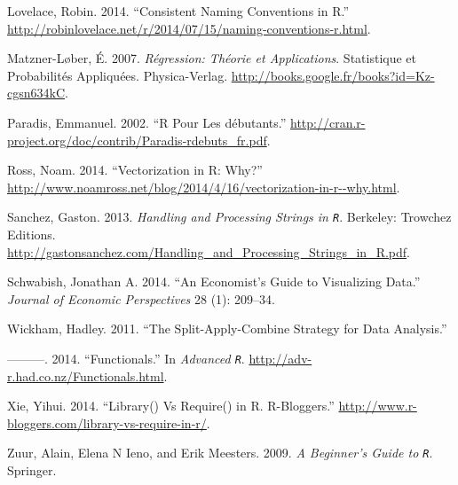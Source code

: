 \documentclass[
  11pt,
]{book}
\numberwithin{equation}{section}
\numberwithin{countremarque}{section}
\newlength{\cslhangindent}
\newenvironment{cslreferences}%
  {\setlength{\parindent}{0pt}%
  \everypar{\setlength{\hangindent}{\cslhangindent}}\ignorespaces}%
  {\par}
\begin{document}
\begin{cslreferences}
\leavevmode\hypertarget{ref-Lovelace_2014_Consistent}{}%
Lovelace, Robin. 2014. ``Consistent Naming Conventions in R.'' \url{http://robinlovelace.net/r/2014/07/15/naming-conventions-r.html}.

\leavevmode\hypertarget{ref-Matzner_2007_Regression}{}%
Matzner-Løber, É. 2007. \emph{Régression: Théorie et Applications}. Statistique et Probabilités Appliquées. Physica-Verlag. \url{http://books.google.fr/books?id=Kz-cgsn634kC}.

\leavevmode\hypertarget{ref-Paradis_2002_R}{}%
Paradis, Emmanuel. 2002. ``R Pour Les débutants.'' \url{http://cran.r-project.org/doc/contrib/Paradis-rdebuts_fr.pdf}.

\leavevmode\hypertarget{ref-Ross_2014_Vectorization}{}%
Ross, Noam. 2014. ``Vectorization in R: Why?'' \url{http://www.noamross.net/blog/2014/4/16/vectorization-in-r--why.html}.

\leavevmode\hypertarget{ref-Sanchez_2013_Handling}{}%
Sanchez, Gaston. 2013. \emph{Handling and Processing Strings in \texttt{R}}. Berkeley: Trowchez Editions. \url{http://gastonsanchez.com/Handling_and_Processing_Strings_in_R.pdf}.

\leavevmode\hypertarget{ref-schwabish2014economist}{}%
Schwabish, Jonathan A. 2014. ``An Economist's Guide to Visualizing Data.'' \emph{Journal of Economic Perspectives} 28 (1): 209--34.

\leavevmode\hypertarget{ref-Wickham_2011_Split}{}%
Wickham, Hadley. 2011. ``The Split-Apply-Combine Strategy for Data Analysis.''

\leavevmode\hypertarget{ref-Wickham_2014_Advanced_R_Functionals}{}%
---------. 2014. ``Functionals.'' In \emph{Advanced \texttt{R}}. \url{http://adv-r.had.co.nz/Functionals.html}.

\leavevmode\hypertarget{ref-Xie_r2014_require}{}%
Xie, Yihui. 2014. ``Library() Vs Require() in R. R-Bloggers.'' \url{http://www.r-bloggers.com/library-vs-require-in-r/}.

\leavevmode\hypertarget{ref-Zuur_2009_Beginner}{}%
Zuur, Alain, Elena N Ieno, and Erik Meesters. 2009. \emph{A Beginner's Guide to \texttt{R}}. Springer.
\end{cslreferences}
\end{document}
